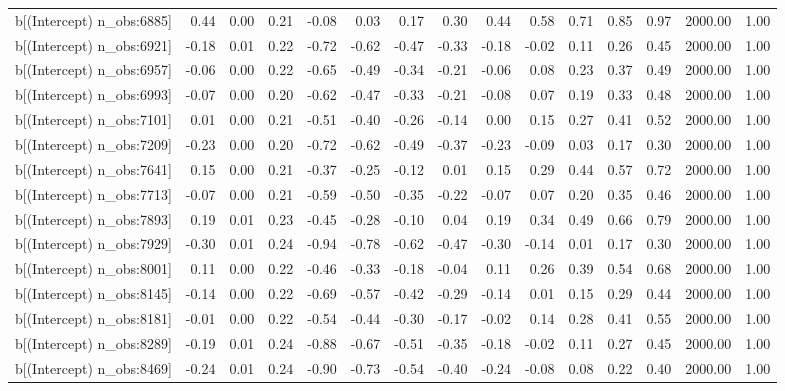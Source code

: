 \begin{table}[ht]
\begin{tabular}{rrrrrrrrrrrrrrr}
  b[(Intercept) n\_obs:6885] & 0.44 & 0.00 & 0.21 & -0.08 & 0.03 & 0.17 & 0.30 & 0.44 & 0.58 & 0.71 & 0.85 & 0.97 & 2000.00 & 1.00 \\ 
  b[(Intercept) n\_obs:6921] & -0.18 & 0.01 & 0.22 & -0.72 & -0.62 & -0.47 & -0.33 & -0.18 & -0.02 & 0.11 & 0.26 & 0.45 & 2000.00 & 1.00 \\ 
  b[(Intercept) n\_obs:6957] & -0.06 & 0.00 & 0.22 & -0.65 & -0.49 & -0.34 & -0.21 & -0.06 & 0.08 & 0.23 & 0.37 & 0.49 & 2000.00 & 1.00 \\ 
  b[(Intercept) n\_obs:6993] & -0.07 & 0.00 & 0.20 & -0.62 & -0.47 & -0.33 & -0.21 & -0.08 & 0.07 & 0.19 & 0.33 & 0.48 & 2000.00 & 1.00 \\ 
  b[(Intercept) n\_obs:7101] & 0.01 & 0.00 & 0.21 & -0.51 & -0.40 & -0.26 & -0.14 & 0.00 & 0.15 & 0.27 & 0.41 & 0.52 & 2000.00 & 1.00 \\ 
  b[(Intercept) n\_obs:7209] & -0.23 & 0.00 & 0.20 & -0.72 & -0.62 & -0.49 & -0.37 & -0.23 & -0.09 & 0.03 & 0.17 & 0.30 & 2000.00 & 1.00 \\ 
  b[(Intercept) n\_obs:7641] & 0.15 & 0.00 & 0.21 & -0.37 & -0.25 & -0.12 & 0.01 & 0.15 & 0.29 & 0.44 & 0.57 & 0.72 & 2000.00 & 1.00 \\ 
  b[(Intercept) n\_obs:7713] & -0.07 & 0.00 & 0.21 & -0.59 & -0.50 & -0.35 & -0.22 & -0.07 & 0.07 & 0.20 & 0.35 & 0.46 & 2000.00 & 1.00 \\ 
  b[(Intercept) n\_obs:7893] & 0.19 & 0.01 & 0.23 & -0.45 & -0.28 & -0.10 & 0.04 & 0.19 & 0.34 & 0.49 & 0.66 & 0.79 & 2000.00 & 1.00 \\ 
  b[(Intercept) n\_obs:7929] & -0.30 & 0.01 & 0.24 & -0.94 & -0.78 & -0.62 & -0.47 & -0.30 & -0.14 & 0.01 & 0.17 & 0.30 & 2000.00 & 1.00 \\ 
  b[(Intercept) n\_obs:8001] & 0.11 & 0.00 & 0.22 & -0.46 & -0.33 & -0.18 & -0.04 & 0.11 & 0.26 & 0.39 & 0.54 & 0.68 & 2000.00 & 1.00 \\ 
  b[(Intercept) n\_obs:8145] & -0.14 & 0.00 & 0.22 & -0.69 & -0.57 & -0.42 & -0.29 & -0.14 & 0.01 & 0.15 & 0.29 & 0.44 & 2000.00 & 1.00 \\ 
  b[(Intercept) n\_obs:8181] & -0.01 & 0.00 & 0.22 & -0.54 & -0.44 & -0.30 & -0.17 & -0.02 & 0.14 & 0.28 & 0.41 & 0.55 & 2000.00 & 1.00 \\ 
  b[(Intercept) n\_obs:8289] & -0.19 & 0.01 & 0.24 & -0.88 & -0.67 & -0.51 & -0.35 & -0.18 & -0.02 & 0.11 & 0.27 & 0.45 & 2000.00 & 1.00 \\ 
  b[(Intercept) n\_obs:8469] & -0.24 & 0.01 & 0.24 & -0.90 & -0.73 & -0.54 & -0.40 & -0.24 & -0.08 & 0.08 & 0.22 & 0.40 & 2000.00 & 1.00 \\ 

\end{tabular}
\end{table}
